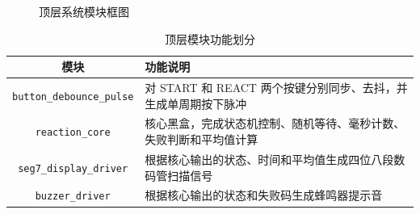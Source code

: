 \begin{figure}[H]
{
  }
  \caption{顶层系统模块框图}
  \label{fig:top-module-block-diagram}
\end{figure}

\begin{table}[H]
  \centering
  \caption{顶层模块功能划分}
  \label{tab:top-module-summary}
  \begin{tabular}{c|l}
    \hline
    模块 & 功能说明 \\
    \hline
    \texttt{button\_debounce\_pulse} & 对 START 和 REACT 两个按键分别同步、去抖，并生成单周期按下脉冲 \\
    \texttt{reaction\_core} & 核心黑盒，完成状态机控制、随机等待、毫秒计数、失败判断和平均值计算 \\
    \texttt{seg7\_display\_driver} & 根据核心输出的状态、时间和平均值生成四位八段数码管扫描信号 \\
    \texttt{buzzer\_driver} & 根据核心输出的状态和失败码生成蜂鸣器提示音 \\
    \hline
  \end{tabular}
\end{table}
